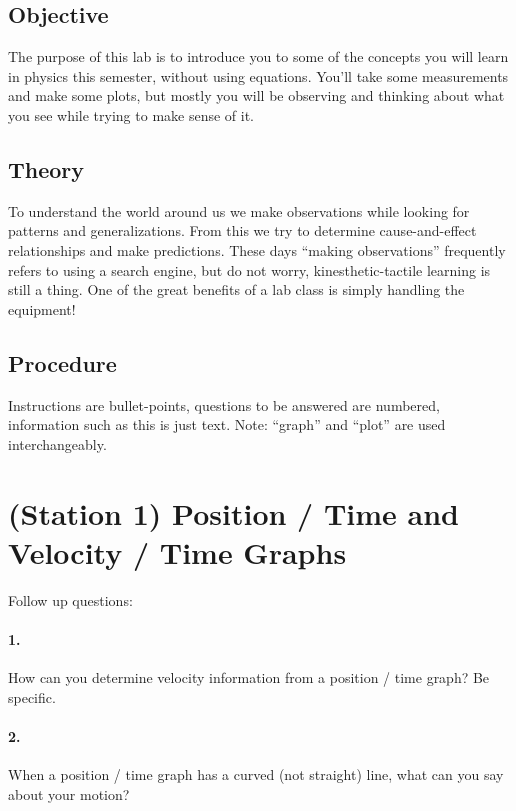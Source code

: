     \subsection*{Objective}

    The purpose of this lab is to introduce you to some of the concepts you will learn in physics this semester, without using equations. You’ll take some measurements and make some plots, but mostly you will be observing and thinking about what you see while trying to make sense of it. 

    \subsection*{Theory}

    To understand the world around us we make observations while looking for patterns and generalizations. From this we try to determine cause-and-effect relationships and make predictions. These days “making observations” frequently refers to using a search engine, but do not worry, kinesthetic-tactile learning is still a thing. One of the great benefits of a lab class is simply handling the equipment! 


    \subsection*{Procedure} 
    
    Instructions are bullet-points, questions to be answered are numbered, information such as this is just text. Note: “graph” and “plot” are used interchangeably.

    \pagebreak

    \section*{(Station 1) Position / Time and Velocity / Time Graphs}

    Follow up questions:
    
    \paragraph*{1.} How can you determine velocity information from a position / time graph? Be specific.

    \begin{mdframed}
        
    \end{mdframed}

    \paragraph*{2.} When a position / time graph has a curved (not straight) line, what can you say about your motion?
    
